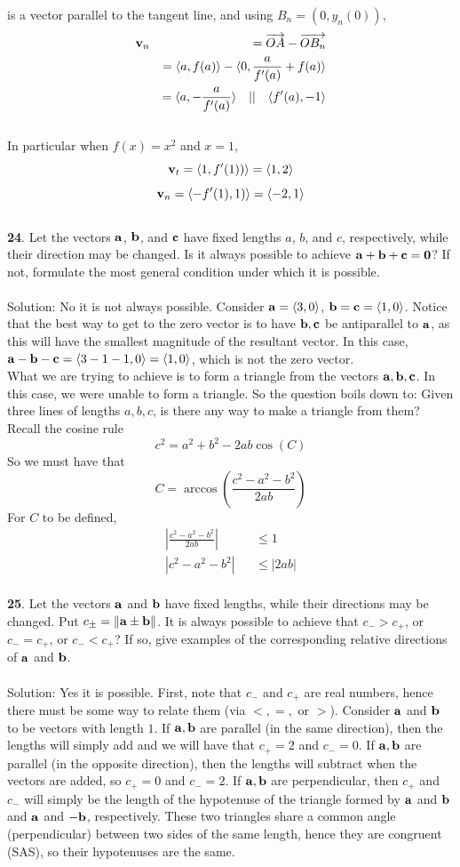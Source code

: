 \documentclass[12pt]{amsbook}
\newcommand{\la}{\langle}
\newcommand{\ra}{\rangle}
\begin{document}
is a vector parallel to the tangent line, and using $B_n=(0,y_n(0))$,
\begin{eqnarray*}
{\bf v}_n &&= \overrightarrow{OA}-\overrightarrow{OB_n} \\
&&= \la a,f(a) \ra - \la 0,\frac{a}{f'(a)}+f(a) \ra \\
&&= \la a,-\frac{a}{f'(a)} \ra \quad || \quad \la f'(a),-1 \ra
\end{eqnarray*}
\\
In particular when $f(x)=x^2$ and $x=1$,
$${\bf v}_t=\la 1,f'(1)) \ra = \la 1,2 \ra $$
$${\bf v}_n=\la -f'(1),1) \ra = \la -2,1 \ra $$
\\
{\small\bf 24}. Let the vectors ${\bf a}$, ${\bf b}$,
and ${\bf c}$ have fixed lengths $a$, $b$, and $c$,
respectively, while their direction may be changed. 
Is it always possible to achieve ${\bf a}+{\bf b}+{\bf c}=
{\bf 0}$? If not, formulate the most general condition under which
it is possible.\\
\\ 
{\sc Solution}:
No it is not always possible. Consider ${\bf a}= \la 3,0 \ra $, ${\bf b}={\bf c}= \la 1,0 \ra$. Notice that the best way to get to the zero vector is to have $\bf b,c$ be antiparallel to $\bf a$, as this will have the smallest magnitude of the resultant vector. In this case, ${\bf a-b-c}=\la 3-1-1,0 \ra = \la 1,0 \ra$, which is not the zero vector. \\
What we are trying to achieve is to form a triangle from the vectors $\bf a,b,c$. In this case, we were unable to form a triangle. So the question boils down to: Given three lines of lengths $a,b,c$, is there any way to make a triangle from them? Recall the cosine rule
$$c^2=a^2+b^2-2ab\cos(C)$$
So we must have that 
$$C=\arccos({\frac{c^2-a^2-b^2}{2ab}})$$
For $C$ to be defined,
\begin{eqnarray*}
|{\frac{c^2-a^2-b^2}{2ab}}| &&\leq 1 \\
|c^2-a^2-b^2| &&\leq |2ab|
\end{eqnarray*}
\\
{\small\bf 25}. Let the vectors  ${\bf a}$ and ${\bf b}$
have fixed lengths, while their directions may be changed.
Put $c_\pm =\|{\bf a}\pm {\bf b}\|$.
It is always possible to achieve that $c_->c_+$, or 
$c_-=c_+$, or $c_-<c_+$? If so, give examples of the 
corresponding
relative directions of ${\bf a}$ and ${\bf b}$.\\
\\ 
{\sc Solution}:
Yes it is possible. First, note that $c_-$ and $c_+$ are real numbers, hence there must be some way to relate them (via $<,=,$ or $>$). Consider $\bf a$ and $\bf b$ to be vectors with length $1$. If $\bf a,b$ are parallel (in the same direction), then the lengths will simply add and we will have that $c_+=2$ and $c_-=0$. If $\bf a,b$ are parallel (in the opposite direction), then the lengths will subtract when the vectors are added, so $c_+=0$ and $c_-=2$. If $\bf a,b$ are perpendicular, then $c_+$ and $c_-$ will simply be the length of the hypotenuse of the triangle formed by $\bf a$ and $\bf b$ and $\bf a$ and $\bf -b$, respectively. These two triangles share a common angle (perpendicular) between two sides of the same length, hence they are congruent (SAS), so their hypotenuses are the same. 
\end{document}
